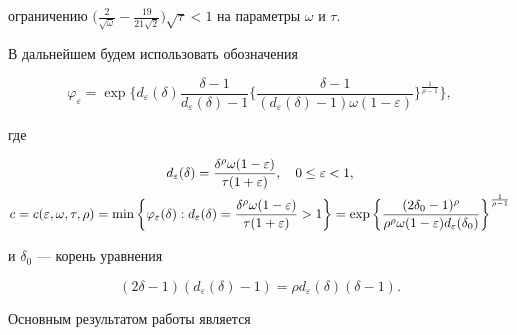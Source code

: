 ограничению $\big(\frac{2}{\sqrt{\omega}}-\frac{19}{21\sqrt{2}}\big) 


\sqrt{\tau}<1$ на параметры $\omega$ и $\tau$. 


 


В дальнейшем будем использовать обозначения 


\begin{equation} 


\varphi_\varepsilon=\exp\bigg\{d_\varepsilon(\delta) 


\frac{\delta-1}{d_\varepsilon(\delta)-1}\bigg\{ 


\frac{\delta-1}{(d_\varepsilon(\delta)-1)\omega(1-\varepsilon)} 


\bigg\}^{\frac{1}{\rho-1}}\bigg\}, 


\end{equation} 


где 


\begin{gather} 


d_\varepsilon(\delta)= 


\frac{\delta^\rho\omega(1-\varepsilon)}{\tau(1+\varepsilon)}, 


\quad 0\le\varepsilon<1,\notag \\ 


c=c(\varepsilon,\omega,\tau,\rho)=\min\bigg\{ 


\varphi_\varepsilon(\delta):d_\varepsilon(\delta)= 


\frac{\delta^\rho\omega(1-\varepsilon)}{\tau(1+\varepsilon)} 


>1\bigg\}=\exp\bigg\{ 


\frac{(2\delta_0-1)^\rho}{\rho^\rho\omega(1-\varepsilon) 


d_\varepsilon(\delta_0)}\bigg\}^{\frac{1}{\rho-1}} 


\end{gather} 


и $\delta_0$ --- корень уравнения 


\begin{equation} 


(2\delta-1)(d_\varepsilon(\delta)-1)= 


\rho d_\varepsilon(\delta)(\delta-1). 


\end{equation} 


 


Основным результатом работы является  


